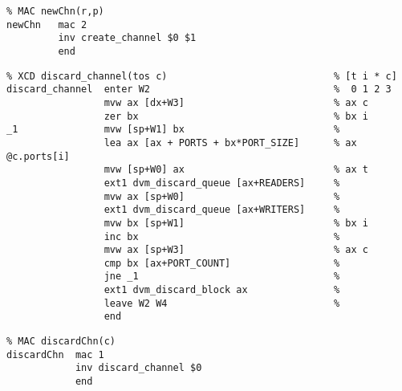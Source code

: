 {\small
\begin{verbatim}
% MAC newChn(r,p)
newChn   mac 2
         inv create_channel $0 $1
         end
\end{verbatim}}


\begin{tabbing}
\indents
{}
\fin
\end{tabbing}

{\small
\begin{verbatim}
% XCD discard_channel(tos c)                             % [t i * c]
discard_channel  enter W2                                %  0 1 2 3
                 mvw ax [dx+W3]                          % ax c
                 zer bx                                  % bx i
_1               mvw [sp+W1] bx                          %
                 lea ax [ax + PORTS + bx*PORT_SIZE]      % ax @c.ports[i]
                 mvw [sp+W0] ax                          % ax t
                 ext1 dvm_discard_queue [ax+READERS]     %
                 mvw ax [sp+W0]                          %
                 ext1 dvm_discard_queue [ax+WRITERS]     %
                 mvw bx [sp+W1]                          % bx i
                 inc bx                                  %
                 mvw ax [sp+W3]                          % ax c
                 cmp bx [ax+PORT_COUNT]                  %
                 jne _1                                  %
                 ext1 dvm_discard_block ax               %
                 leave W2 W4                             %
                 end
\end{verbatim}}

\begin{tabbing}
\indents
{}
\fin
\end{tabbing}

{\small
\begin{verbatim}
% MAC discardChn(c)
discardChn  mac 1
            inv discard_channel $0
            end
\end{verbatim}}

\begin{tabbing}
\indents
{}
\fin
\end{tabbing}

